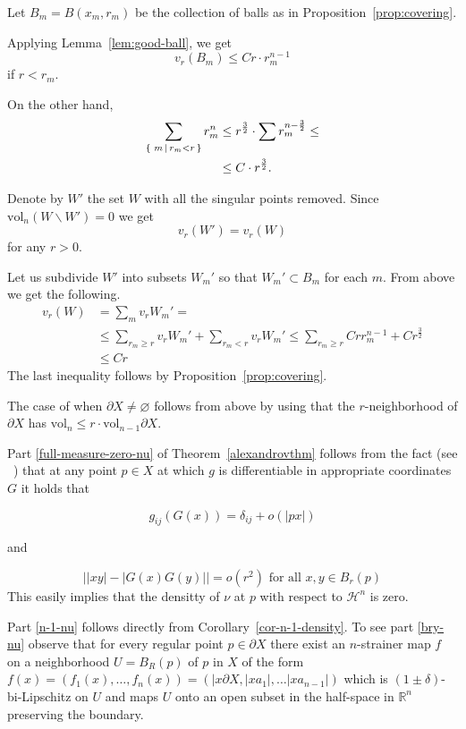 \documentclass[12pt,leqno]{amsart}
\numberwithin{equation}{section}
\theoremstyle{definition}
\theoremstyle{remark}
\newcommand{\vol}{\mathrm{vol}}
\newcommand{\R}{\mathbb{R}}
\newcommand*{\set}[2]{\left\{\,\left.{#1}\vphantom{#2}\,\right|\,{#2}\,\right\}}
\def\emptyset{\varnothing}
\begin{document}
Let $B_m=B(x_m,r_m)$ be the collection of balls as in Proposition~\ref{prop:covering}.

Applying Lemma~\ref{lem:good-ball},
we get
$$v_r(B_m)\le Cr\cdot r_m^{n-1}$$
if $r<r_m$.

On the other hand,
\begin{align*}
\sum_{\set{m}{r_m<r}}r_m^n
&\le r^{\frac32}\cdot\sum r_m^{n-\frac32}\le
\\
&\le C\cdot r^{\frac32}.
\end{align*}

Denote by $W'$ the set $W$ with all the singular points removed.
Since $\vol_n(W\backslash W')=0$ we get
\[v_r(W')=v_r(W)\]
for any $r>0$.

Let us subdivide $W'$ into subsets $W_m'$ so that
$W_m'\subset B_m$ for each $m$.
From above we get the following.
\begin{align*}
v_r(W)
&= \sum_m v_r W_m'=
\\
&\le \sum_{r_m\ge r} v_r W_m'
+
 \sum_{r_m< r} v_r W_m'\le  \sum_{r_m\ge r}Crr_m^{n-1}+Cr^{\frac 3 2}
\\
&\le Cr
\end{align*}
The last inequality follows by  Proposition~\ref{prop:covering}.



The case of when $\partial X\ne\emptyset$ follows from above by using that the $r$-neighborhood of $\partial X$ has $\vol_n\le r\cdot \vol_{n-1}\partial X$.

Part \eqref{full-measure-zero-nu} of Theorem~\ref{alexandrovthm}  follows from the fact (see ~\cite{Per-DC}) that at any point $p\in X$ at which $g$ is differentiable in appropriate coordinates $G$ it holds that

\[
g_{ij}(G(x))=\delta_{ij}+o(|px|)
\]

and

\[
 \big| |xy|-|G(x)G(y)|\big|=o(r^2) \text{ for all } x,y\in B_r(p)
\]
This easily implies that the densitty of $\nu$ at $p$ with respect to $\mathcal H^n$  is zero.

Part \eqref{n-1-nu} follows directly from Corollary~\ref {cor-n-1-density}. To see part \eqref{bry-nu}  observe that  for every regular point $p\in\partial X$ there exist an $n$-strainer map $f$ on a neighborhood $U=B_R(p)$ of $p$ in $X$ of the form $f(x)=(f_1(x),\ldots, f_n(x))=(|x\partial X, |xa_1|,\ldots |x a_{n-1}|)$ which is $(1\pm\delta)$-bi-Lipschitz on $U$ and maps $U$ onto an open subset in the half-space in $\R^n$ preserving the boundary.
\end{document}

